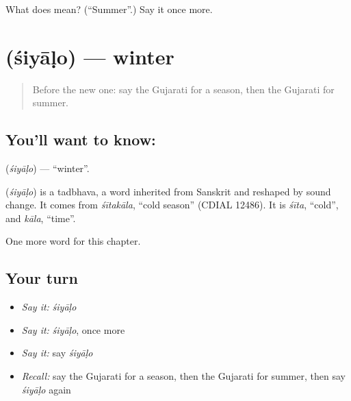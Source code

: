 \begin{tcolorbox}[breakable,colback=teal!4,colframe=teal!35!black,title={Before you move on}]
What does  mean? (\textquotedblleft{}Summer\textquotedblright{}.) Say it once more.
\end{tcolorbox}
\section[\texorpdfstring{\gu{શિયાળો} (śiyāḷo)}{શિયાળો (śiyāḷo)}]{ (śiyāḷo) — winter}

\label{lesson:GU-C93-siyalo}



\begin{quote}
Before the new one: say the Gujarati for a season, then the Gujarati for summer.
\end{quote}

\subsection*{You'll want to know: }
\textbf{} (\emph{śiyāḷo}) — \textquotedblleft{}winter\textquotedblright{}.

\begin{cousinweb}
\textbf{} (\emph{śiyāḷo}) is a tadbhava, a word inherited from Sanskrit and reshaped by sound change. It comes from \emph{śītakāla}, \textquotedblleft{}cold season\textquotedblright{} (CDIAL 12486). It is \emph{śīta}, \textquotedblleft{}cold\textquotedblright{}, and \emph{kāla}, \textquotedblleft{}time\textquotedblright{}.
\end{cousinweb}

\begin{grammarlens}[title={What you've built}]
One more word for this chapter.
\end{grammarlens}

\subsection*{Your turn}
\begin{itemize}
\raggedright
  \item \emph{Say it:} \emph{śiyāḷo}
  \item \emph{Say it:} \emph{śiyāḷo}, once more
  \item \emph{Say it:} say \emph{śiyāḷo}
  \item \emph{Recall:} say the Gujarati for a season, then the Gujarati for summer, then say \emph{śiyāḷo} again
\end{itemize}

